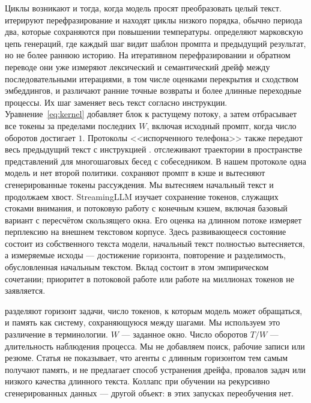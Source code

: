 \documentclass[10pt]{article}
\begin{document}
Циклы возникают и тогда, когда модель просят преобразовать целый текст.
\citet{wang2025} итерируют перефразирование и находят циклы низкого порядка,
обычно периода два, которые сохраняются при повышении температуры.
\citet{geng2026} определяют марковскую цепь генераций, где каждый шаг
видит шаблон промпта и предыдущий результат, но не более раннюю историю.
На итеративном перефразировании и обратном переводе они уже измеряют
лексический и семантический дрейф между последовательными итерациями,
в том числе оценками перекрытия и сходством эмбеддингов, и различают
ранние точные возвраты и более длинные переходные процессы.
Их шаг заменяет весь текст согласно инструкции.
Уравнение~\eqref{eq:kernel} добавляет блок к растущему потоку, а затем
отбрасывает все токены за пределами последних $W$, включая исходный промпт,
когда число оборотов достигает $1$.
Протоколы <<испорченного телефона>> также передают весь предыдущий текст
с инструкцией \citep{perez2025,mohamed2025}.
\citet{ko2026} отслеживают траектории в пространстве представлений
для многошаговых бесед с собеседником.
В нашем протоколе одна модель и нет второй политики.
\citet{wang2026random} сохраняют промпт в кэше и вытесняют
сгенерированные токены рассуждения.
Мы вытесняем начальный текст и продолжаем хвост.
StreamingLLM \citep{streamingllm2024} изучает сохранение токенов,
служащих стоками внимания, и потоковую работу с конечным кэшем,
включая базовый вариант с пересчётом скользящего окна.
Его оценка на длинном потоке измеряет перплексию на внешнем текстовом корпусе.
Здесь развивающееся состояние состоит из собственного текста модели,
начальный текст полностью вытесняется, а измеряемые исходы --- достижение
горизонта, повторение и разделимость, обусловленная начальным текстом.
Вклад состоит в этом эмпирическом сочетании; приоритет в потоковой работе
или работе на миллионах токенов не заявляется.

\citet{chen2026horizon} разделяют горизонт задачи, число токенов,
к которым модель может обращаться, и память как систему,
сохраняющуюся между шагами.
Мы используем это различение в терминологии.
$W$ --- заданное окно.
Число оборотов $T/W$ --- длительность наблюдения процесса.
Мы не добавляем поиск, рабочие записи или резюме.
Статья не показывает, что агенты с длинным горизонтом тем самым
получают память, и не предлагает способ устранения дрейфа,
провалов задач или низкого качества длинного текста.
Коллапс при обучении на рекурсивно сгенерированных данных
\citep{shumailov2024} --- другой объект: в этих запусках переобучения нет.
\end{document}
